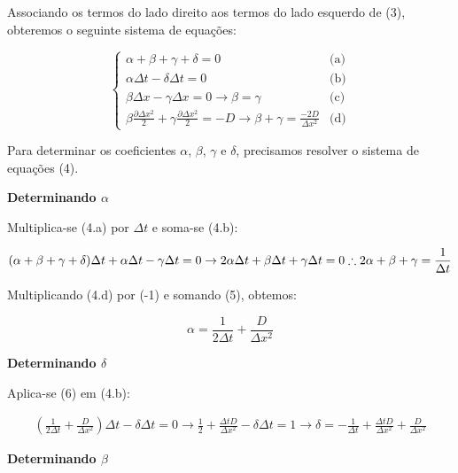 \documentclass[11pt]{article}
\begin{document}
Associando os termos do lado direito aos termos do lado esquerdo de (3),
obteremos o seguinte sistema de equações:

\begin{equation}
  \begin{cases}
    \alpha + \beta + \gamma + \delta = 0 & \text{(a)}\\
    \alpha \Delta{t} - \delta \Delta{t} = 0  & \text{(b)} \\
    \beta \Delta{x} - \gamma \Delta{x} = 0 \to \beta = \gamma & \text{(c)}\\
    \beta \frac{\partial{\Delta{x^2}}}{2} + \gamma \frac{\partial{\Delta{x^2}}}{2} = -D \to \beta + \gamma = \frac{-2D}{\Delta{x^2}} & \text{(d)}
  \end{cases}
\end{equation}

Para determinar os coeficientes \(\alpha\), \(\beta\), \(\gamma\) e
\(\delta\), precisamos resolver o sistema de equações (4).

\textbf{Determinando \(\alpha\)}

Multiplica-se (4.a) por \(\Delta{t}\) e soma-se (4.b):

\begin{equation}
    (\alpha + \beta + \gamma + \delta)\Delta{t} + \alpha \Delta{t} - \gamma \Delta{t} = 0 \to 2\alpha{\Delta{t}} + \beta{\Delta{t}} + \gamma{\Delta{t}} = 0 \\ 
    \therefore 2\alpha + \beta + \gamma = \frac{1}{\Delta{t}}
\end{equation}

Multiplicando (4.d) por (-1) e somando (5), obtemos:

\begin{equation}
    \alpha = \frac{1}{2\Delta{t}} + \frac{D}{\Delta{x^2}}
\end{equation}

\textbf{Determinando \(\delta\)}

Aplica-se (6) em (4.b):

\begin{equation}
    \begin{aligned}
        (\frac{1}{2\Delta{t}} + \frac{D}{\Delta{x^2}})\Delta{t} - \delta \Delta{t} = 0 \to  \frac{1}{2} + \frac{\Delta{t}D}{\Delta{x^2}} - \delta{\Delta{t}} = 1 \to \delta = -\frac{1}{\Delta{t}} + \frac{\Delta{t}D}{\Delta{x^2}} + \frac{D}{\Delta{x^2}}
    \end{aligned}
\end{equation}

\textbf{Determinando \(\beta\)}
\end{document}
